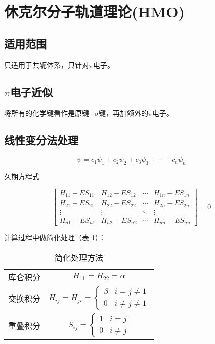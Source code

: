 \section{休克尔分子轨道理论(HMO)}

\subsection{适用范围}

只适用于共轭体系，只针对$\pi$电子。

\subsection{$\pi$电子近似}

将所有的化学键看作是原键+$\sigma$键，再加额外的$\pi$电子。


\subsection{线性变分法处理}


\begin{equation*}
    \psi = c_1 \psi_1 + c_2 \psi_2 + c_3 \psi_3 + \cdots + c_n \psi_n
\end{equation*}

久期方程式

\begin{equation*}
    \begin{bmatrix*}
        H_{11} - ES_{11} & H_{12} - ES_{12} & \cdots & H_{1n} - ES_{1n} \\
        H_{21} - ES_{21} & H_{22} - ES_{22} & \cdots & H_{2n} - ES_{2n} \\
        \vdots & \vdots & \ddots & \vdots \\
        H_{n1} - ES_{n1} & H_{n2} - ES_{n2} & \cdots & H_{nn} - ES_{nn}
    \end{bmatrix*} = 0
\end{equation*}

计算过程中做简化处理（表 \ref{tab:simplify}）：


\begin{table}[h]
    \centering
    \begin{tabular}{cc}
        库仑积分 & $H_{11} = H_{22} = \alpha$                 \\
        交换积分 & $H_{ij} = H_{ji} = \begin{cases}
                                              \beta & i = j \neq 1    \\
                                              0     & i \neq j \neq 1
                                          \end{cases}$ \\
        重叠积分 & $S_{ij} = \begin{cases}
                                     1 & i = j    \\
                                     0 & i \neq j
                                 \end{cases}$
    \end{tabular}
    \caption{简化处理方法}
    \label{tab:simplify}
\end{table}


